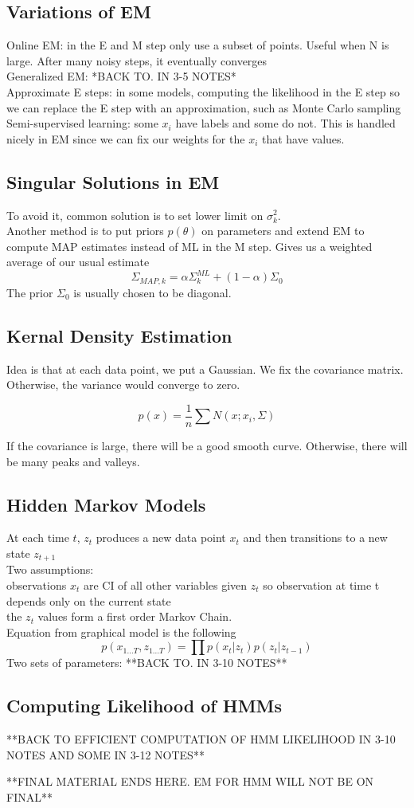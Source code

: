 \documentclass[11pt,psfig]{article}
\begin{document}
\subsection*{Variations of EM}

Online EM: in the E and M step only use a subset of points. Useful when N is large. After many noisy steps, it eventually converges
\\
Generalized EM: *BACK TO. IN 3-5 NOTES*
\\
Approximate E steps: in some models, computing the likelihood in the E step so we can replace the E step with an approximation, such as Monte Carlo sampling
\\
Semi-supervised learning: some $x_i$ have labels and some do not. This is handled nicely in EM since we can fix our weights for the $x_i$ that have values. 

\subsection*{Singular Solutions in EM}

To avoid it, common solution is to set lower limit on $\sigma_k^2$.\\
Another method is to put priors $p(\theta)$ on parameters and extend EM to compute MAP estimates instead of ML in the M step. Gives us a weighted average of our usual estimate
\[
\Sigma_{MAP,k} = \alpha \Sigma_k^{ML} + (1-\alpha)\Sigma_0
\]
The prior $\Sigma_0$ is usually chosen to be diagonal. 

\subsection*{Kernal Density Estimation}

Idea is that at each data point, we put a Gaussian. We fix the covariance matrix. Otherwise, the variance would converge to zero. 

\[
p(x) = \frac{1}{n} \sum{N(x;x_i,\Sigma)}
\]

If the covariance is large, there will be a good smooth curve. Otherwise, there will be many peaks and valleys. 

\subsection*{Hidden Markov Models}

At each time $t$, $z_t$ produces a new data point $x_t$ and then transitions to a new state $z_{t+1}$\\
Two assumptions:
\\
observations $x_t$ are CI of all other variables given $z_t$ so observation at time t depends only on the current state
\\
the $z_t$ values form a first order Markov Chain.\\
Equation from graphical model is the following
\[
p(x_{1...T},z_{1...T}) = \prod p(x_t|z_t)p(z_t|z_{t-1})
\]
Two sets of parameters:
**BACK TO. IN 3-10 NOTES**
\\

\subsection*{Computing Likelihood of HMMs}

**BACK TO EFFICIENT COMPUTATION OF HMM LIKELIHOOD IN 3-10 NOTES AND SOME IN 3-12 NOTES**

**FINAL MATERIAL ENDS HERE. EM FOR HMM WILL NOT BE ON FINAL**
\end{document}

